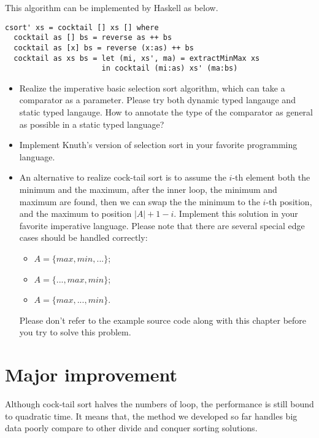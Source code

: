\documentclass{article}
\begin{document}
This algorithm can be implemented by Haskell as below.

\lstset{language=Haskell}
\begin{lstlisting}
csort' xs = cocktail [] xs [] where
  cocktail as [] bs = reverse as ++ bs
  cocktail as [x] bs = reverse (x:as) ++ bs
  cocktail as xs bs = let (mi, xs', ma) = extractMinMax xs 
                      in cocktail (mi:as) xs' (ma:bs)  
\end{lstlisting}

\begin{Exercise}
  \begin{itemize}
    \item Realize the imperative basic selection sort algorithm, which can take a comparator as a parameter. Please try both dynamic typed langauge and static typed langauge. How to annotate the type of the comparator as general as possible in a static typed language? 
   \item Implement Knuth's version of selection sort in your favorite programming language.
   \item An alternative to realize cock-tail sort is to assume the $i$-th element both the minimum and the maximum, after the inner loop, the minimum and maximum are found, then we can swap the the minimum to the $i$-th position, and
the maximum to position $|A|+1-i$. Implement this solution in your favorite imperative language. Please note that
there are several special edge cases should be handled correctly:
    \begin{itemize}
      \item $A = \{max, min, ...\}$;
      \item $A = \{..., max, min\}$;
      \item $A = \{max, ..., min\}$.
    \end{itemize}
    Please don't refer to the example source code along with this chapter before you try to solve this problem.
  \end{itemize}
\end{Exercise}


\section{Major improvement}

Although cock-tail sort halves the numbers of loop, the performance is still bound to quadratic time.
It means that, the method we developed so far handles big data poorly compare to other divide and conquer
sorting solutions.
\end{document}
